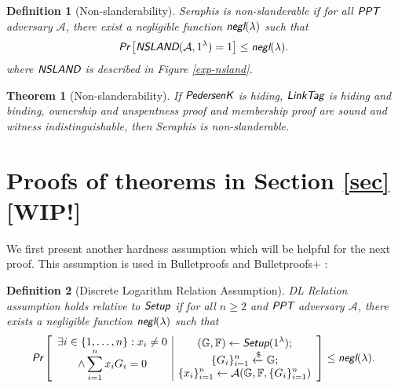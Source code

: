 \documentclass{article}
\theoremstyle{plain}
\newtheorem{definition}{Definition}[section]
\newtheorem{theorem}{Theorem}[section]
\theoremstyle{remark}
\begin{document}
\begin{definition}[Non-slanderability]
Seraphis is non-slanderable if for all $\emph{\textsf{PPT}}$ adversary $\mathcal{A}$, there exist a negligible function $\emph{\textsf{negl}}(\lambda)$ such that
\begin{align*}
\emph{\textsf{Pr}}
\left[
\emph{\textsf{NSLAND}}(\mathcal{A}, 1^{\lambda})=1
\right]
\le \emph{\textsf{negl}}(\lambda).
\end{align*}
where $\emph{\textsf{NSLAND}}$ is described in Figure \ref{exp-nsland}.
\end{definition}
\begin{theorem}[Non-slanderability]\label{thm-nsland}
If $\emph{\textsf{PedersenK}}$ is hiding, $\emph{\textsf{LinkTag}}$ is hiding and binding, ownership and unspentness proof and membership proof are sound and witness indistinguishable, then Seraphis is non-slanderable.
\end{theorem}




\appendix

\section{Proofs of theorems in Section \ref{sec} [WIP!]}\label{proofs}
We first present another hardness assumption which will be helpful for the next proof. This assumption is used in Bulletproofs \cite{bp} and Bulletproofs+ \cite{bp-plus}:

\begin{definition}[Discrete Logarithm Relation Assumption]\label{dl-rel}
DL Relation assumption holds relative to $\emph{\textsf{Setup}}$ if for all $n \ge 2$ and  $\emph{\textsf{PPT}}$ adversary $\mathcal{A}$, there exists a negligible function $\emph{\textsf{negl}}(\lambda)$ such that
\begin{align*}
\emph{\textsf{Pr}}\left[
\begin{array}{c|c}
	\begin{gathered}
		\exists i \in \{1, \ldots, n\}: x_i \ne 0 \\
		\wedge \sum_{i=1}^{n} x_i G_i = 0
	\end{gathered}
	&
	\begin{gathered}
		(\mathbb{G}, \mathbb{F})\leftarrow\emph{\textsf{Setup}}(1^{\lambda}); \\
		\{G_i\}_{i=1}^n \xleftarrow{\$}\mathbb{G}; \\
		\{x_i\}_{i=1}^n \leftarrow\mathcal{A}(\mathbb{G}, \mathbb{F}, \{G_i\}_{i=1}^n) \\
	\end{gathered}
\end{array}
\right]
\le \emph{\textsf{negl}}(\lambda).
\end{align*}
\end{definition}
\end{document}
